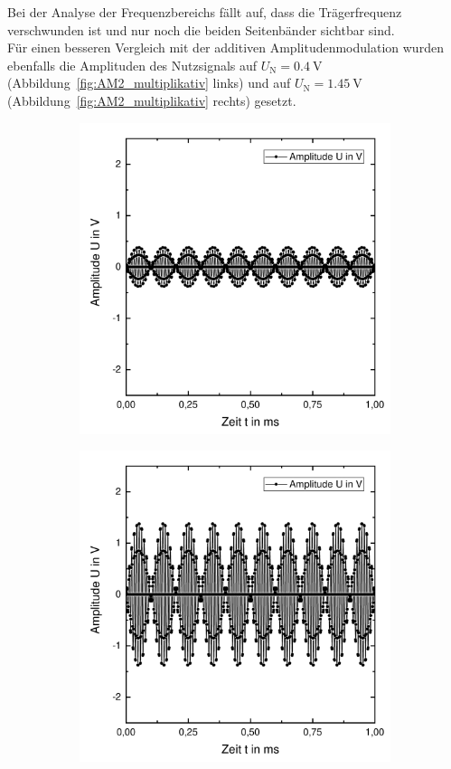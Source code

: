 \documentclass[a4paper,twoside,final]{article}
\begin{document}
Bei der Analyse der Frequenzbereichs fällt auf, dass die Trägerfrequenz verschwunden ist und nur noch die beiden Seitenbänder sichtbar sind.\\
Für einen besseren Vergleich mit der additiven Amplitudenmodulation wurden ebenfalls die Amplituden des Nutzsignals auf $U_\text{N} = \SI{0,4}{\volt}$ (Abbildung~\ref{fig:AM2_multiplikativ} links) und auf $U_\text{N} = \SI{1,45}{\volt}$ (Abbildung~\ref{fig:AM2_multiplikativ} rechts) gesetzt.
\begin{figure}[htp]
    \centering
    \begin{subfigure}{0.45\textwidth}
        \includegraphics[width=\textwidth]{Bilder/AM2_mult_Zeit.pdf}
    \end{subfigure}
    \begin{subfigure}{0.45\textwidth}
        \includegraphics[width=\textwidth]{Bilder/AM3_mult_Zeit.pdf}

\end{subfigure}
\end{figure}
\end{document}
